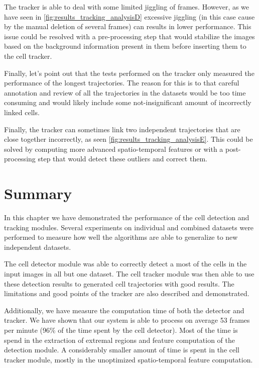 	The tracker is able to deal with some limited jiggling of frames. However, as we have seen in \cref{fig:results_tracking_analysisD} excessive jiggling (in this case cause by the manual deletion of several frames) can results in lower performance. This issue could be resolved with a pre-processing step that would stabilize the images based on the background information present in them before inserting them to the cell tracker.
	
	Finally, let's point out that the tests performed on the tracker only measured the performance of the longest trajectories. The reason for this is to that careful annotation and review of all the trajectories in the datasets would be too time consuming and would likely include some not-insignificant amount of incorrectly linked cells.
	
	Finally, the tracker can sometimes link two independent trajectories that are close together incorrectly, as seen \cref{fig:results_tracking_analysisE}. This could be solved by computing more advanced spatio-temporal features or with a post-processing step that would detect these outliers and correct them.
	
\section{Summary \statusfirstdraft}
	\label{sec:results_summary}
	
	In this chapter we have demonstrated the performance of the cell detection and tracking modules. Several experiments on individual and combined datasets were performed to measure how well the algorithms are able to generalize to new independent datasets.
	
	The cell detector module was able to correctly detect a most of the cells in the input images in all but one dataset. The cell tracker module was then able to use these detection results to generated cell trajectories with good results. The limitations and good points of the tracker are also described and demonstrated.

	Additionally, we have measure the computation time of both the detector and tracker. We have shown that our system is able to process on average 53 frames per minute (96\% of the time spent by the cell detector). Most of the time is spend in the extraction of extremal regions and feature computation of the detection module. A considerably smaller amount of time is spent in the cell tracker module, mostly in the unoptimized spatio-temporal feature computation.